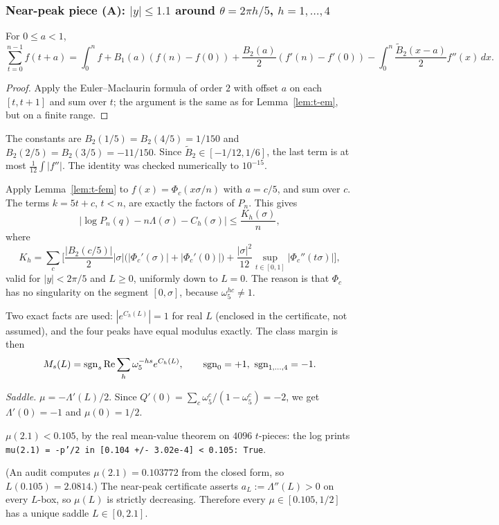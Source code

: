 \subsubsection{Near-peak piece (A): \texorpdfstring{$|y|\le1.1$}{|y| <= 1.1} around \texorpdfstring{$\theta=2\pi h/5$}{theta = 2 pi h/5}, \texorpdfstring{$h=1,\dots,4$}{h = 1..4}}\label{sec:nearpeak}

\begin{lemma}\label{lem:t-fem}
For $0\le a<1$,
\[
\sum_{t=0}^{n-1}f(t+a)=\int_0^nf+B_1(a)(f(n)-f(0))+\frac{B_2(a)}2(f'(n)-f'(0))-\int_0^n\frac{\tilde B_2(x-a)}2f''(x)\,dx .
\]
\end{lemma}
\begin{proof}
Apply the Euler--Maclaurin formula of order $2$ with offset $a$ on each $[t,t+1]$ and sum over $t$; the argument is the same
as for Lemma~\ref{lem:t-em}, but on a finite range.
\end{proof}
The constants are $B_2(1/5)=B_2(4/5)=1/150$ and $B_2(2/5)=B_2(3/5)=-11/150$. Since $\tilde B_2\in[-1/12,1/6]$, the last
term is at most $\frac1{12}\int|f''|$. The identity was checked numerically to $10^{-15}$.

\begin{lemma}\label{lem:t-logS}
Apply Lemma~\ref{lem:t-fem} to $f(x)=\Phi_c(x\sigma/n)$ with $a=c/5$, and sum over $c$. The terms $k=5t+c$, $t<n$, are
exactly the factors of $P_n$. This gives
\[
\big|\log P_n(q)-n\Lambda(\sigma)-C_h(\sigma)\big|\le\frac{K_h(\sigma)}n,
\]
where
\[
K_h=\sum_c\Big[\frac{|B_2(c/5)|}2|\sigma|\big(|\Phi_c'(\sigma)|+|\Phi_c'(0)|\big)+\frac{|\sigma|^2}{12}\sup_{t\in[0,1]}|\Phi_c''(t\sigma)|\Big],
\]
valid for $|y|<2\pi/5$ and $L\ge0$, uniformly down to $L=0$. The reason is that $\Phi_c$ has no singularity on the segment
$[0,\sigma]$, because $\omega_5^{hc}\ne1$.
\end{lemma}

Two exact facts are used: $|e^{C_h(L)}|=1$ for real $L$ (enclosed in the certificate, not assumed), and the four peaks have
equal modulus exactly. The class margin is then
\[
M_s(L)=\operatorname{sgn}_s\operatorname{Re}\sum_h\omega_5^{-hs}e^{C_h(L)},\qquad \operatorname{sgn}_0=+1,\ \operatorname{sgn}_{1,\dots,4}=-1 .
\]

\emph{Saddle.} $\mu=-\Lambda'(L)/2$. Since $Q'(0)=\sum_c\omega_5^c/(1-\omega_5^c)=-2$, we get $\Lambda'(0)=-1$ and
$\mu(0)=1/2$.

\begin{lemma}\label{lem:t-saddle}
$\mu(2.1)<0.105$, by the real mean-value theorem on $4096$ $t$-pieces: the log prints
\texttt{mu(2.1) = -p'/2 in [0.104 +/- 3.02e-4] < 0.105: True}.
\end{lemma}
(An audit computes $\mu(2.1)=0.103772$ from the closed form, so $L(0.105)=2.0814$.) The near-peak certificate asserts
$a_L:=\Lambda''(L)>0$ on every $L$-box, so $\mu(L)$ is strictly decreasing. Therefore every $\mu\in[0.105,1/2]$ has a
unique saddle $L\in[0,2.1]$.

